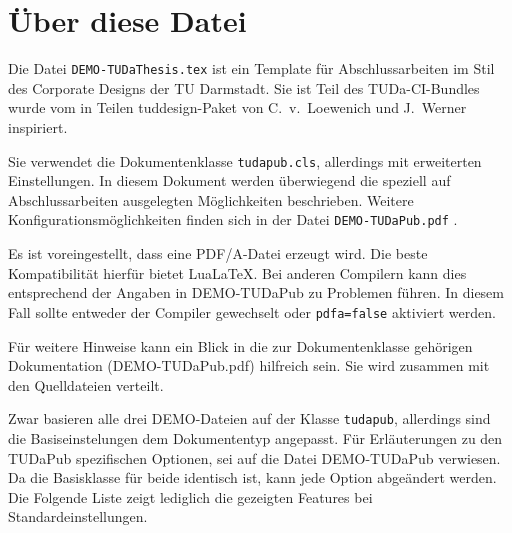 \documentclass[
	ngerman,
	ruledheaders=section,%
	class=report,%
	thesis={type=bachelor},%
	accentcolor=9c,%
	custommargins=true,%
	marginpar=false,%
	parskip=half-,%
	fontsize=11pt,%
]{tudapub}
\let\file\texttt
\let\code\texttt
\begin{document}
\chapter{Über diese Datei}
Die Datei \file{DEMO-TUDaThesis.tex} ist ein Template für Abschlussarbeiten im Stil des Corporate Designs der TU Darmstadt.
Sie ist Teil des TUDa-CI-Bundles wurde vom in Teilen tuddesign-Paket von C.~v.~Loewenich und J.~Werner inspiriert.

Sie verwendet die Dokumentenklasse \file{tudapub.cls}, allerdings mit erweiterten Einstellungen. In diesem Dokument werden überwiegend die speziell auf Abschlussarbeiten ausgelegten Möglichkeiten beschrieben. Weitere Konfigurationsmöglichkeiten finden sich in der Datei \file{DEMO-TUDaPub.pdf} \cite{tudapub}.

Es ist voreingestellt, dass eine PDF/A-Datei erzeugt wird. Die beste Kompatibilität hierfür bietet Lua\LaTeX. Bei anderen Compilern kann dies entsprechend der Angaben in DEMO-TUDaPub zu Problemen führen. In diesem Fall sollte entweder der Compiler gewechselt oder \code{pdfa=false} aktiviert werden.

Für weitere Hinweise kann ein Blick in die zur Dokumentenklasse gehörigen Dokumentation (DEMO-TUDaPub.pdf) hilfreich sein. Sie wird zusammen mit den Quelldateien verteilt.

Zwar basieren alle drei DEMO-Dateien auf der Klasse \code{tudapub}, allerdings sind die Basiseinstelungen dem Dokumententyp angepasst.
Für Erläuterungen zu den TUDaPub spezifischen Optionen, sei auf die Datei DEMO-TUDaPub verwiesen.
Da die Basisklasse für beide identisch ist, kann jede Option abgeändert werden. Die Folgende Liste zeigt lediglich die gezeigten Features bei Standardeinstellungen.
\end{document}
